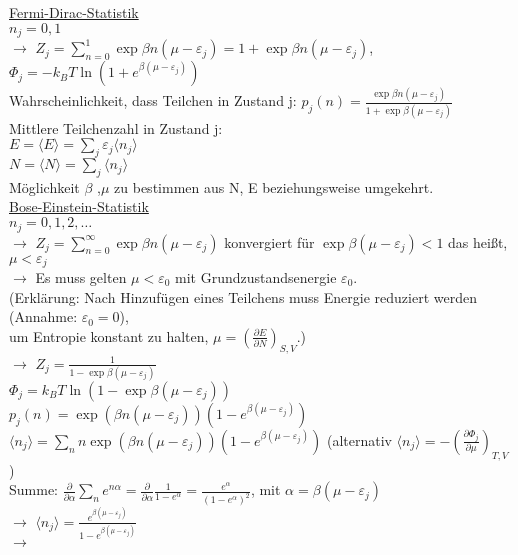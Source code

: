 \begin{tabbing}
\underline{Fermi-Dirac-Statistik}\\
$n_j = 0,1$\\
$\rightarrow$\> $Z_j = \sum\limits_{n = 0}^{1}\exp \beta n \left(\mu - \varepsilon_j\right) = 1 + \exp \beta n \left(\mu - \varepsilon_j\right)$, $\Phi_j = - k_B T \ln \left(1 + e^{\beta (\mu - \varepsilon_j)}\right)$\\
\>Wahrscheinlichkeit, dass Teilchen in Zustand j: $p_j(n) = \frac{\exp \beta n \left(\mu - \varepsilon_j \right)}{1+ \exp \beta (\mu - \varepsilon_j)}$\\
\>Mittlere Teilchenzahl in Zustand j: \\
\>$E = \langle E \rangle = \sum\limits_j \varepsilon_j \langle n_j \rangle$\\
\> $N = \langle N \rangle = \sum\limits_j \langle n_j\rangle$\\
Möglichkeit $\beta$ ,$\mu$ zu bestimmen aus N, E beziehungsweise umgekehrt.\\


\underline{Bose-Einstein-Statistik}\\
$n_j = 0,1,2,\dots$\\
$\rightarrow$\> $Z_j = \sum\limits_{n = 0}^{\infty} \exp \beta n (\mu - \varepsilon_j)$ konvergiert für $\exp \beta (\mu - \varepsilon_j) < 1$ das heißt, $\mu < \varepsilon_j$\\
$\rightarrow$ \> Es muss gelten $\mu < \varepsilon_0$ mit Grundzustandsenergie $\varepsilon_0$.\\
(Erklärung: Nach Hinzufügen eines Teilchens muss Energie reduziert werden (Annahme: $\varepsilon_0 = 0$),\\
\> um Entropie konstant zu halten, $\mu = \left(\frac{\partial E}{\partial N}\right)_{S,V}$.)\\
$\rightarrow$\> $Z_j = \frac{1}{1 - \exp \beta (\mu - \varepsilon_j)}$\\
\> $\Phi_j = k_B T \ln \left(1 - \exp \beta (\mu - \varepsilon_j)\right)$\\
\>$p_j(n) = \exp \left(\beta n (\mu - \varepsilon_j)\right)\left(1 - e^{\beta (\mu - \varepsilon_j)}\right)$\\
\>$\langle n_j \rangle = \sum_n n \exp \left(\beta n(\mu - \varepsilon_j)\right)\left(1-e^{\beta(\mu - \varepsilon_j)}\right)$ (alternativ $\langle n_j\rangle = -\left(\frac{\partial \Phi_j}{\partial \mu}\right)_{T,V}$)\\
Summe: $\frac{\partial}{\partial \alpha}\sum\limits_n e^{n \alpha} = \frac{\partial}{\partial \alpha} \frac{1}{1 - e^{\alpha}} = \frac{e^{\alpha}}{(1 - e^{\alpha})^2}$, mit $\alpha = \beta (\mu - \varepsilon_j)$\\
$\rightarrow$\> $\langle n_j \rangle = \frac{e^{\beta(\mu - \varepsilon_j)}}{1 - e^{\beta (\mu - \varepsilon_j)}}$\\
$\rightarrow$\> \\



\end{tabbing}
